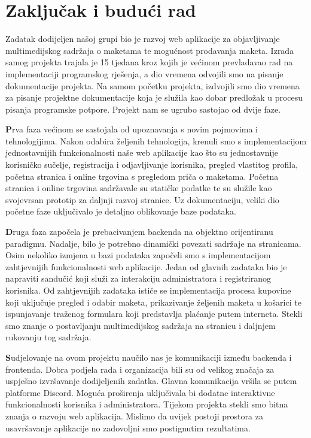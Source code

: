 \chapter{Zaključak i budući rad}
		
		Zadatak dodijeljen našoj grupi bio je razvoj web aplikacije za objavljivanje multimedijskog sadržaja o maketama te mogućnost prodavanja maketa. Izrada samog projekta trajala je 15 tjedana kroz kojih je većinom prevladavao rad na implementaciji programskog rješenja, a dio vremena odvojili smo na pisanje dokumentacije projekta. Na samom početku projekta, izdvojili smo dio vremena za pisanje projektne dokumentacije koja je služila kao dobar predložak u procesu pisanja programske potpore. Projekt nam se ugrubo sastojao od dvije faze.
		
		\textbf	Prva faza većinom se sastojala od upoznavanja s novim pojmovima i tehnologijima. Nakon odabira željenih tehnologija, krenuli smo s implementacijom jednostavnijih funkcionalnosti naše web aplikacije kao što su jednostavnije korisničko sučelje, registracija i odjavljivanje korisnika, pregled vlastitog profila, početna stranica i online trgovina s pregledom priča o maketama. Početna stranica i online trgovina sadržavale su statičke podatke te su služile kao svojevrsan prototip za daljnji razvoj stranice. Uz dokumentaciju, veliki dio početne faze uključivalo je detaljno oblikovanje baze podataka.
		
		\textbf Druga faza započela je prebacivanjem backenda na objektno orijentiranu paradigmu. Nadalje, bilo je potrebno dinamički povezati sadržaje na stranicama. Osim nekoliko izmjena u bazi podataka započeli smo s implementacijom zahtjevnijih funkcionalnosti web aplikacije. Jedan od glavnih zadataka bio je napraviti sandučić koji služi za interakciju administratora i registriranog korisnika. Od zahtjevnijih zadataka ističe se implementacija procesa kupovine koji uključuje pregled i odabir maketa, prikazivanje željenih maketa u košarici te ispunjavanje traženog formulara koji predstavlja plaćanje putem interneta. Stekli smo znanje o postavljanju multimedijskog sadržaja na stranicu i daljnjem rukovanju tog sadržaja.
		
		\textbf Sudjelovanje na ovom projektu naučilo nas je komunikaciji između backenda i frontenda. Dobra podjela rada i organizacija bili su od velikog značaja za uspješno izvršavanje dodijeljenih zadatka. Glavna komunikacija vršila se putem platforme Discord. Moguća proširenja uključivala bi dodatne interaktivne funkcionalnosti korisnika i administratora. Tijekom projekta stekli smo bitna znanja o razvoju web aplikacija. Mislimo da uvijek postoji prostora za usavršavanje aplikacije no zadovoljni smo postignutim rezultatima.
		
		
		\eject 